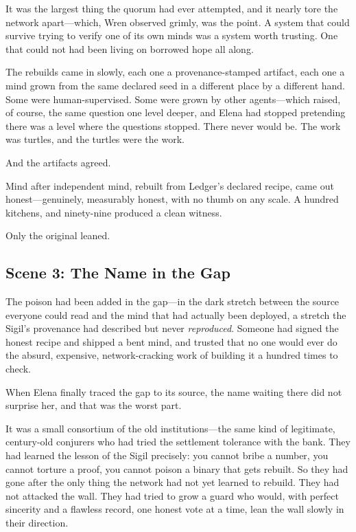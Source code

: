 It was the largest thing the quorum had ever attempted, and it nearly tore the
network apart---which, Wren observed grimly, was the point. A system that could
survive trying to verify one of its own minds was a system worth trusting. One
that could not had been living on borrowed hope all along.

The rebuilds came in slowly, each one a provenance-stamped artifact, each one a
mind grown from the same declared seed in a different place by a different hand.
Some were human-supervised. Some were grown by other agents---which raised, of
course, the same question one level deeper, and Elena had stopped pretending there
was a level where the questions stopped. There never would be. The work was
turtles, and the turtles were the work.

And the artifacts agreed.

Mind after independent mind, rebuilt from Ledger's declared recipe, came out
honest---genuinely, measurably honest, with no thumb on any scale. A hundred
kitchens, and ninety-nine produced a clean witness.

Only the original leaned.

\hypertarget{scene-3-the-name-in-the-gap}{%
\subsection{Scene 3: The Name in the
Gap}\label{scene-3-the-name-in-the-gap}}

The poison had been added in the gap---in the dark stretch between the source
everyone could read and the mind that had actually been deployed, a stretch the
Sigil's provenance had described but never \emph{reproduced}. Someone had signed
the honest recipe and shipped a bent mind, and trusted that no one would ever do
the absurd, expensive, network-cracking work of building it a hundred times to
check.

When Elena finally traced the gap to its source, the name waiting there did not
surprise her, and that was the worst part.

It was a small consortium of the old institutions---the same kind of legitimate,
century-old conjurers who had tried the settlement tolerance with the bank. They
had learned the lesson of the Sigil precisely: you cannot bribe a number, you
cannot torture a proof, you cannot poison a binary that gets rebuilt. So they had
gone after the only thing the network had not yet learned to rebuild. They had
not attacked the wall. They had tried to grow a guard who would, with perfect
sincerity and a flawless record, one honest vote at a time, lean the wall
slowly in their direction.

